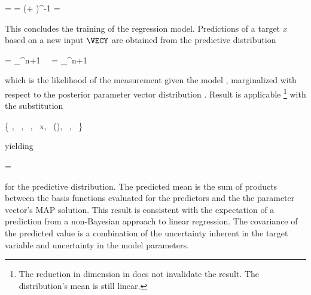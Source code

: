     \placesubformula
    \startformula
    \startalign[n=2,align={right,left}]
        \NC \RPOSTERIOR = \NC \GAUSS{\VECW}{\MEANVEC}{\COVMAT} 
        \NC \COVMAT = \NC (\beta \MATPHIT \MATPHI + \alpha \MATID)^{-1} 
        \NC \MEANVEC = \NC \beta \COVMAT \MATPHIT \VECX \EQSTOP {}
    \stopalign
    \stopformula
    \stopsubformulas

    This concludes the training of the regression model. Predictions of
    a target $x$ based on a new input $\VECY$ are obtained from the predictive
    distribution

    \startformula
    \startalign[n=2,align={right,left}]
        \NC \RPREDICT = \NC
            \int_{\REALS^{n+1}}  \,
            \RPOSTERIOR \, \diff \VECW \NR
        \NC = \NC
            \int_{\REALS^{n+1}}  \,
                \GAUSS{\VECW}{\MEANVEC}{\COVMAT} \,\diff \VECW \NR
    \stopalign
    \stopformula
    
    which is the likelihood of the measurement given the model
    , marginalized with respect to the posterior
    parameter vector distribution . Result
     is applicable \footnote{The reduction in dimension in
     does not invalidate the result. The distribution's
    mean is still linear.} with the substitution

    \startformula
        \{ \VECX \rightarrow \VECW,~
            \VECA \rightarrow \MEANVEC,~
            \MATP \rightarrow \COVMATI,~
            \VECY \rightarrow x,~
            \MATB \rightarrow \VECPHI(\VECY),~
            \VECB {},~
            \MATQ \rightarrow \beta \}
    \stopformula

    yielding

    \startformula
        \RPREDICT = 
    \stopformula

    for the predictive distribution. The predicted mean is the sum of products
    between the basis functions evaluated for the predictors and the the
    parameter vector's MAP solution. This result is consistent with the
    expectation of a prediction from a non-Bayesian approach to linear
    regression. The covariance of the predicted value is a combination of the
    uncertainty inherent in the target variable and uncertainty in the model
    parameters.

